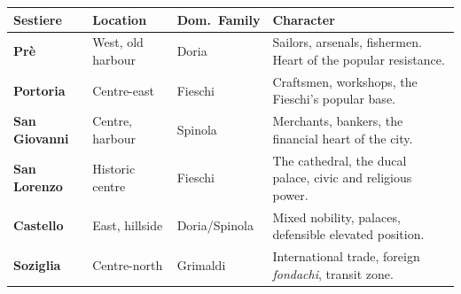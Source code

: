 \begin{center}
\begin{tabularx}{\textwidth}{L{2.5cm} L{3cm} L{2.5cm} X}
  \toprule
  \textbf{Sestiere} & \textbf{Location} & \textbf{Dom.\ Family} & \textbf{Character} \\
  \midrule

  \textbf{Prè} & West, old harbour & Doria & Sailors, arsenals, fishermen. Heart of the popular resistance. \\

  \textbf{Portoria} & Centre-east & Fieschi & Craftsmen, workshops, the Fieschi's popular base. \\

  \textbf{San Giovanni} & Centre, harbour & Spinola & Merchants, bankers, the financial heart of the city. \\

  \textbf{San Lorenzo} & Historic centre & Fieschi & The cathedral, the ducal palace, civic and religious power. \\

  \textbf{Castello} & East, hillside & Doria/Spinola & Mixed nobility, palaces, defensible elevated position. \\

  \textbf{Soziglia} & Centre-north & Grimaldi & International trade, foreign \textit{fondachi}, transit zone. \\
  \bottomrule
\end{tabularx}
\end{center}

